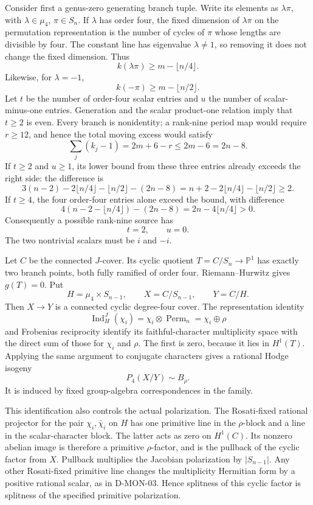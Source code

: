 Consider first a genus-zero generating branch tuple. Write its elements
as \(\lambda\pi\), with \(\lambda\in\mu_4\), \(\pi\in S_n\).
If \(\lambda\) has order four, the fixed dimension of
\(\lambda\pi\) on the permutation representation is the number
of cycles of \(\pi\) whose lengths are divisible by four. The
constant line has eigenvalue \(\lambda\ne1\), so removing it does
not change the fixed dimension. Thus
\[
      k(\lambda\pi)\ge m-\lfloor n/4\rfloor.
\]
Likewise, for \(\lambda=-1\),
\[
      k(-\pi)\ge m-\lfloor n/2\rfloor.
\]
Let \(t\) be the number of order-four scalar entries and \(u\)
the number of scalar-minus-one entries. Generation and the scalar
product-one relation imply that \(t\ge2\) is even.
Every branch is nonidentity; a rank-nine period map would require
\(r\ge12\), and hence the total moving excess would satisfy
\[
    \sum_j(k_j-1)=2m+6-r\le2m-6=2n-8.
\]
If \(t\ge2\) and \(u\ge1\), its lower bound from these three
entries already exceeds the right side: the difference is
\[
 3(n-2)-2\lfloor n/4\rfloor-\lfloor n/2\rfloor-(2n-8)
      =n+2-2\lfloor n/4\rfloor-\lfloor n/2\rfloor\ge2.
\]
If \(t\ge4\), the four order-four entries alone exceed the bound,
with difference
\[
              4(n-2-\lfloor n/4\rfloor)-(2n-8)
                  =2n-4\lfloor n/4\rfloor>0.
\]
Consequently a possible rank-nine source has
\[
                  t=2,\qquad u=0.
\]
The two nontrivial scalars must be \(i\) and \(-i\).

Let \(C\) be the connected \(J\)-cover. Its cyclic quotient
\(T=C/S_n\to\mathbb P^1\) has exactly two branch points, both
fully ramified of order four. Riemann--Hurwitz gives \(g(T)=0\).
Put
\[
 H=\mu_4\times S_{n-1},\qquad
 X=C/S_{n-1},\qquad Y=C/H.
\]
Then \(X\to Y\) is a connected cyclic degree-four cover. The
representation identity
\[
 \operatorname{Ind}_H^J(\chi_i)
       =\chi_i\otimes\operatorname{Perm}_n
       =\chi_i\oplus\rho
\]
and Frobenius reciprocity identify its faithful-character multiplicity
space with the direct sum of those for \(\chi_i\) and \(\rho\).
The first is zero, because it lies in \(H^1(T)\). Applying the same
argument to conjugate characters gives a rational Hodge isogeny
\[
                        P_4(X/Y)\sim B_\rho.
\]
It is induced by fixed group-algebra correspondences in the family.

This identification also controls the actual polarization. The
Rosati-fixed rational projector for the pair \(\chi_i,\bar\chi_i\)
on \(H\) has one primitive line in the \(\rho\)-block and a line
in the scalar-character block. The latter acts as zero on \(H^1(C)\).
Its nonzero abelian image is therefore a primitive \(\rho\)-factor,
and is the pullback of the cyclic factor from \(X\). Pullback
multiplies the Jacobian polarization by \(|S_{n-1}|\). Any other
Rosati-fixed primitive line changes the multiplicity Hermitian form by
a positive rational scalar, as in D-MON-03. Hence splitness of this
cyclic factor is splitness of the specified primitive polarization.

